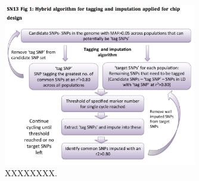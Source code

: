 \begin{figure}
\centering
\includegraphics[trim={0 0 0 1cm},clip,width=0.75\textwidth]{fig/SN13f1}
\caption[xxx]{XXXXXXXX.}
\label{fig:SN13f1}
\end{figure}